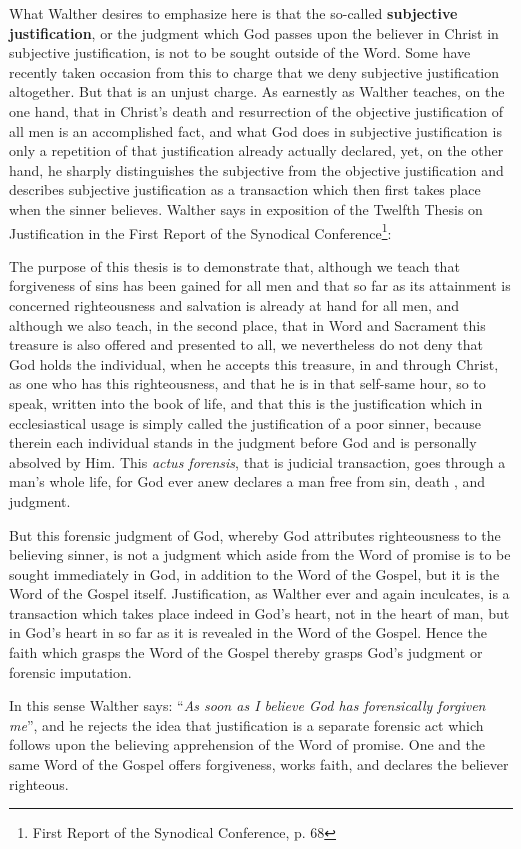                 What Walther desires to emphasize here is that the so-called \textbf{subjective justification}, or the judgment which God passes upon the believer in Christ in subjective justification, is not to be sought outside of the Word.  Some have recently taken occasion from this to charge that we deny subjective justification altogether.  But that is an unjust charge.  As earnestly as Walther teaches, on the one hand, that in Christ’s death and resurrection of the objective justification of all men is an accomplished fact, and what God does in subjective justification is only a repetition of that justification already actually declared, yet, on the other hand, he sharply distinguishes the subjective from the objective justification and describes subjective justification as a transaction which then first takes place when the sinner believes.  Walther says in exposition of the Twelfth Thesis on Justification in the First Report of the Synodical Conference\footnote{First Report of the Synodical Conference,  p. 68}: \begin{fancyquotes}The purpose of this thesis is to demonstrate that, although we teach that forgiveness of sins has been gained for all men and that so far as its attainment is concerned righteousness and salvation is already at hand for all men, and although we also teach, in the second place, that in Word and Sacrament this treasure is also offered and presented to all, we nevertheless do not deny that God holds the individual, when he accepts this treasure, in and through Christ, as one who has this righteousness, and that he is in that self-same hour, so to speak, written into the book of life, and that this is the justification which in ecclesiastical usage is simply called the justification of a poor sinner, because therein each individual stands in the judgment before God and is personally absolved by Him.  This \textit{actus forensis}, that is judicial transaction, goes through a man’s whole life, for God ever anew declares a man free from sin, death , and judgment.\end{fancyquotes}  But this forensic judgment of God, whereby God attributes righteousness to the believing sinner, is not a judgment which aside from the Word of promise is to be sought immediately in God, in addition to the Word of the Gospel, but it is the Word of the Gospel itself.  Justification, as Walther ever and again inculcates, is a transaction which takes place indeed in God’s heart, not in the heart of man, but in God’s heart in so far as it is revealed in the Word of the Gospel.  Hence the faith which grasps the Word of the Gospel thereby grasps God’s judgment or forensic imputation. \par In this sense Walther says: “\textit{As soon as I believe God has forensically forgiven me}”, and he rejects the idea that justification is a separate forensic act which follows upon the believing apprehension of the Word of promise.  One and the same Word of the Gospel offers forgiveness, works faith, and declares the believer righteous.

